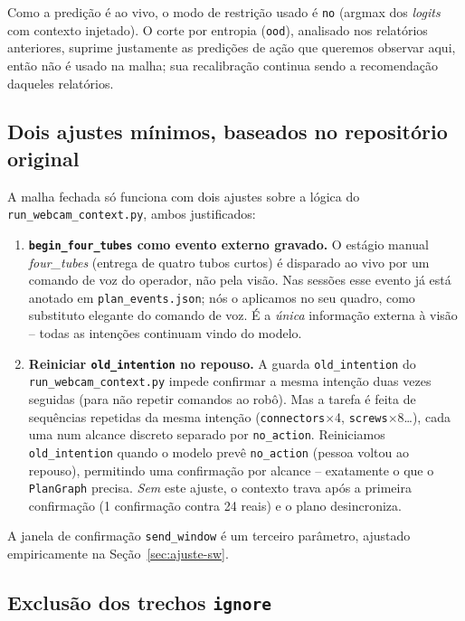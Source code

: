 \documentclass[11pt]{article}
\begin{document}
Como a predição é ao vivo, o modo de restrição usado é \texttt{no} (argmax dos
\emph{logits} com contexto injetado). O corte por entropia (\texttt{ood}),
analisado nos relatórios anteriores, suprime justamente as predições de ação que
queremos observar aqui, então não é usado na malha; sua recalibração continua
sendo a recomendação daqueles relatórios.

\subsection{Dois ajustes mínimos, baseados no repositório original}
\label{sec:ajustes}

A malha fechada só funciona com dois ajustes sobre a lógica do
\texttt{run\_webcam\_context.py}, ambos justificados:

\begin{enumerate}
  \item \textbf{\texttt{begin\_four\_tubes} como evento externo gravado.} O
    estágio manual \emph{four\_tubes} (entrega de quatro tubos curtos) é disparado
    ao vivo por um comando de voz do operador, não pela visão. Nas sessões esse
    evento já está anotado em \texttt{plan\_events.json}; nós o aplicamos no seu
    quadro, como substituto elegante do comando de voz. É a \emph{única}
    informação externa à visão -- todas as intenções continuam vindo do modelo.
  \item \textbf{Reiniciar \texttt{old\_intention} no repouso.} A guarda
    \texttt{old\_intention} do \texttt{run\_webcam\_context.py} impede confirmar
    a mesma intenção duas vezes seguidas (para não repetir comandos ao robô). Mas
    a tarefa é feita de sequências repetidas da mesma intenção
    (\texttt{connectors}$\times$4, \texttt{screws}$\times$8\dots), cada uma num
    alcance discreto separado por \texttt{no\_action}. Reiniciamos
    \texttt{old\_intention} quando o modelo prevê \texttt{no\_action} (pessoa
    voltou ao repouso), permitindo uma confirmação por alcance -- exatamente o
    que o \texttt{PlanGraph} precisa. \emph{Sem} este ajuste, o contexto trava
    após a primeira confirmação (1 confirmação contra 24 reais) e o plano
    desincroniza.
\end{enumerate}

A janela de confirmação \texttt{send\_window} é um terceiro parâmetro, ajustado
empiricamente na Seção~\ref{sec:ajuste-sw}.

\subsection{Exclusão dos trechos \texttt{ignore}}
\label{sec:ignore}
\end{document}
